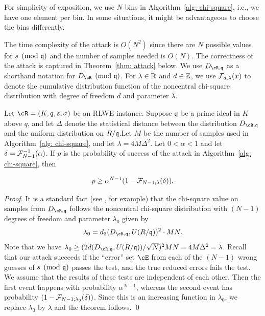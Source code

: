 \documentclass[envcountsect]{llncs}
\begin{document}
\begin{remark}
For simplicity of exposition, we use $N$ bins in Algorithm~\ref{alg: chi-square}, i.e., we have one element per bin. In some situations, 
it might be advantageous to choose the bins differently.
\end{remark}



The time complexity of the attack is $O(N^2)$ since there are $N$ possible values for $s \pmod {\mathfrak{q}}$ and the number of samples needed is $O(N)$. The correctness of the attack is captured in Theorem~\ref{thm: attack} below. We use $D_{\cR,\fq}$ as a shorthand notation for $D_{\cR} \pmod{\fq}$. For $\lambda \in \mathbb{R}$ and $d \in \mathbb{Z}$, we use $\mathcal{F}_{d,\lambda}(x)$ to denote the cumulative distribution function of the noncentral chi-square distribution with degree of freedom $d$ and parameter $\lambda$.

\begin{theorem} \label{thm: attack}
Let $\cR  = (K,q,s, \sigma)$ be an RLWE instance. Suppose $\mathfrak{q}$ be a prime ideal in $K$ above $q$, and let $\Delta$ denote the statistical distance between the distribution $D_{\cR, \fq}$ and the uniform distribution on $R/\mathfrak{q}$.Let $M$ be the number of samples used in Algorithm~\ref{alg: chi-square}, and let $\lambda = 4 M \Delta^2$. Let $0 < \alpha < 1$ and let $\delta = \mathcal{F}_{N-1}^{-1}(\alpha)$. If $p$ is the probability of success of the attack in Algorithm~\ref{alg: chi-square}, then

$$p  \geq \alpha^{N-1} (1-  \mathcal{F}_{N-1; \lambda}(\delta) ).$$
\end{theorem}

\begin{proof}
It is a standard fact (see \cite{ryabko2004new}, for example) that the chi-square value on samples from $D_{\cR, \fq}$  follows the noncentral chi-square distribution with $(N-1)$ degrees of freedom and parameter $\lambda_0$ given by
\[
    \lambda_0 =  d_2(D_{\cR, \fq}, U(R/\fq))^2 \cdot MN.
\]
Note that we have $\lambda_0 \geq (2d(D_{\cR, \fq}, U(R/\fq))/\sqrt{N})^2 MN = 4M\Delta^2 = \lambda$. Recall that our attack succeeds if the ``error'' set $\cE$ from each of the $(N-1)$ wrong guesses of $s \pmod{\mathfrak{q}}$ passes the test, and the true reduced errors fails the test. We assume that the results of these tests are independent of each other. Then the first event happens with probability $\alpha^{N-1}$, whereas the second event has probability  $(1-  \mathcal{F}_{N-1; \lambda_0}(\delta))$. Since this is an increasing function in $\lambda_0$, we replace $\lambda_0$ by $\lambda$ and the theorem follows. 
\qed \end{proof}
\end{document}
